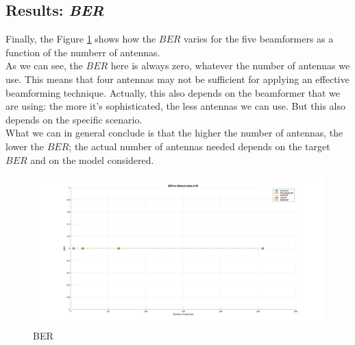 \subsection{Results: \textit{BER}}

Finally, the Figure \ref{fig:BER} shows how the $BER$ varies for the five beamformers as a function of the numberr of antennas.\\
As we can see, the $BER$ here is always zero, whatever the number of antennas we use. This means that four antennas may not
be sufficient for applying an effective beamforming technique. Actually, this also depends on the beamformer that we are using:
the more it's sophisticated, the less antennas we can use. But this also depends on the specific scenario. \\
What we can in general conclude is that the higher the number of antennas, the lower the $BER$; the actual number of antennas 
needed depends on the target $BER$ and on the model considered.

\begin{figure}[ht]
    \includegraphics[width=\linewidth]{BER.jpg}
    \caption{BER}
    \label{fig:BER}
\end{figure}